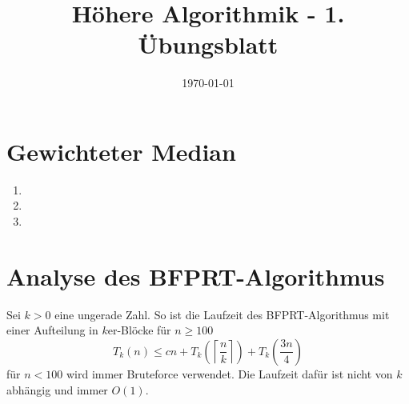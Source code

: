 \documentclass[a4paper,10pt]{scrartcl}
\title{H\"ohere Algorithmik - 1. \"Ubungsblatt}
\author{\Authors}
\date{\today}
\begin{document}
\maketitle

\section{Gewichteter Median}
\begin{enumerate}
\item   
\item   
\item   
\end{enumerate}


\section{Analyse des BFPRT-Algorithmus}
Sei $k > 0$ eine ungerade Zahl. So ist die Laufzeit des BFPRT-Algorithmus mit einer Aufteilung in $k$er-Blöcke für $n \geq 100$
\[T_k(n) \leq cn + T_k\left(\left\lceil\frac{n}{k}\right\rceil\right) + T_k\left(\frac{3n}{4}\right)\tag{s. VL}\]
für $n < 100$ wird immer Bruteforce verwendet. Die Laufzeit dafür ist nicht von $k$ abhängig und immer $O(1)$.
\end{document}
